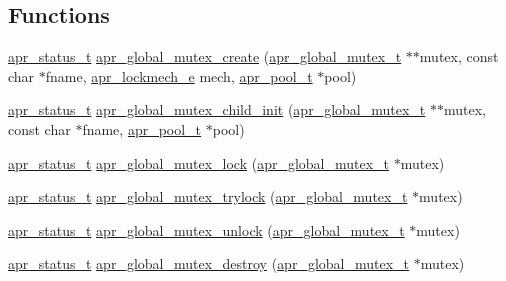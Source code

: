\subsection*{Functions}
\begin{DoxyCompactItemize}
\item 
\hyperlink{group__apr__errno_gaf76ee4543247e9fb3f3546203e590a6c}{apr\-\_\-status\-\_\-t} \hyperlink{group___a_p_r___global_mutex_ga7a5ade1ba8ea6c7a7a61e3e719683cb0}{apr\-\_\-global\-\_\-mutex\-\_\-create} (\hyperlink{group___a_p_r___global_mutex_ga3fc7dc5b076533ee566aa4888ac35ee7}{apr\-\_\-global\-\_\-mutex\-\_\-t} $\ast$$\ast$mutex, const char $\ast$fname, \hyperlink{group__apr__proc__mutex_ga75dd95a48a1e855a87b509b522746ed4}{apr\-\_\-lockmech\-\_\-e} mech, \hyperlink{group__apr__pools_gaf137f28edcf9a086cd6bc36c20d7cdfb}{apr\-\_\-pool\-\_\-t} $\ast$pool)
\item 
\hyperlink{group__apr__errno_gaf76ee4543247e9fb3f3546203e590a6c}{apr\-\_\-status\-\_\-t} \hyperlink{group___a_p_r___global_mutex_ga51eb034bca0352075c92c08a21d4d7a0}{apr\-\_\-global\-\_\-mutex\-\_\-child\-\_\-init} (\hyperlink{group___a_p_r___global_mutex_ga3fc7dc5b076533ee566aa4888ac35ee7}{apr\-\_\-global\-\_\-mutex\-\_\-t} $\ast$$\ast$mutex, const char $\ast$fname, \hyperlink{group__apr__pools_gaf137f28edcf9a086cd6bc36c20d7cdfb}{apr\-\_\-pool\-\_\-t} $\ast$pool)
\item 
\hyperlink{group__apr__errno_gaf76ee4543247e9fb3f3546203e590a6c}{apr\-\_\-status\-\_\-t} \hyperlink{group___a_p_r___global_mutex_ga1338485664e6c2737340114cace57121}{apr\-\_\-global\-\_\-mutex\-\_\-lock} (\hyperlink{group___a_p_r___global_mutex_ga3fc7dc5b076533ee566aa4888ac35ee7}{apr\-\_\-global\-\_\-mutex\-\_\-t} $\ast$mutex)
\item 
\hyperlink{group__apr__errno_gaf76ee4543247e9fb3f3546203e590a6c}{apr\-\_\-status\-\_\-t} \hyperlink{group___a_p_r___global_mutex_ga2a6543fba6473b47e33a7b7fc2ba6935}{apr\-\_\-global\-\_\-mutex\-\_\-trylock} (\hyperlink{group___a_p_r___global_mutex_ga3fc7dc5b076533ee566aa4888ac35ee7}{apr\-\_\-global\-\_\-mutex\-\_\-t} $\ast$mutex)
\item 
\hyperlink{group__apr__errno_gaf76ee4543247e9fb3f3546203e590a6c}{apr\-\_\-status\-\_\-t} \hyperlink{group___a_p_r___global_mutex_ga16e732ae76dfe104b157e0fc543d3aa3}{apr\-\_\-global\-\_\-mutex\-\_\-unlock} (\hyperlink{group___a_p_r___global_mutex_ga3fc7dc5b076533ee566aa4888ac35ee7}{apr\-\_\-global\-\_\-mutex\-\_\-t} $\ast$mutex)
\item 
\hyperlink{group__apr__errno_gaf76ee4543247e9fb3f3546203e590a6c}{apr\-\_\-status\-\_\-t} \hyperlink{group___a_p_r___global_mutex_ga1f2cb4a1ec57089db49701e747892607}{apr\-\_\-global\-\_\-mutex\-\_\-destroy} (\hyperlink{group___a_p_r___global_mutex_ga3fc7dc5b076533ee566aa4888ac35ee7}{apr\-\_\-global\-\_\-mutex\-\_\-t} $\ast$mutex)

\end{DoxyCompactItemize}
